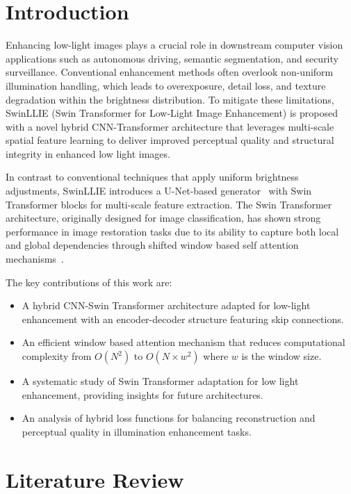 \documentclass[sigconf]{acmart}
\begin{document}
\section{Introduction}

Enhancing low-light images plays a crucial role in downstream computer vision applications such as autonomous driving, semantic segmentation, and security surveillance. Conventional enhancement methods often overlook non-uniform illumination handling, which leads to overexposure, detail loss, and texture degradation within the brightness distribution. To mitigate these limitations, SwinLLIE (Swin Transformer for Low-Light Image Enhancement) is proposed with a novel hybrid CNN-Transformer architecture that leverages multi-scale spatial feature learning to deliver improved perceptual quality and structural integrity in enhanced low light images.

In contrast to conventional techniques that apply uniform brightness adjustments, SwinLLIE introduces a U-Net-based generator~\cite{ronneberger2015unet} with Swin Transformer blocks for multi-scale feature extraction. The Swin Transformer architecture, originally designed for image classification, has shown strong performance in image restoration tasks due to its ability to capture both local and global dependencies through shifted window based self attention mechanisms~\cite{liu2021swin, liang2021swinir}.

The key contributions of this work are:
\begin{itemize}
    \item A hybrid CNN-Swin Transformer architecture adapted for low-light enhancement with an encoder-decoder structure featuring skip connections.
    \item An efficient window based attention mechanism that reduces computational complexity from $O(N^2)$ to $O(N \times w^2)$ where $w$ is the window size.
    \item A systematic study of Swin Transformer adaptation for low light enhancement, providing insights for future architectures.
    \item An analysis of hybrid loss functions for balancing reconstruction and perceptual quality in illumination enhancement tasks.
\end{itemize}

\section{Literature Review}
\end{document}
